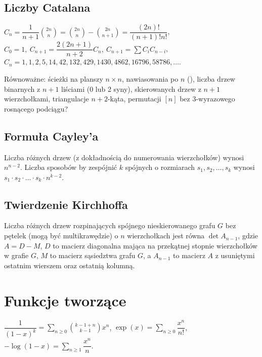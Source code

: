 	\subsection{Liczby Catalana}
		$ C_n=\dfrac{1}{n+1}\binom{2n}{n}= \binom{2n}{n}-\binom{2n}{n+1} = \dfrac{(2n)!}{(n+1)!n!} $,
		$ C_0=1,\ C_{n+1} = \dfrac{2(2n+1)}{n+2}C_n,\ C_{n+1}=\sum C_iC_{n-i} $,
		$C_n = 1, 1, 2, 5, 14, 42, 132, 429, 1430, 4862, 16796, 58786, \dots$.

		Równoważne:
			ścieżki na planszy $n\times n$,
			nawiasowania po $n$ (),
			liczba drzew binarnych z $n+1$ liściami (0 lub 2 syny),
			skierowanych drzew z $n+1$ wierzchołkami,
			triangulacje $n+2$-kąta,
			permutacji $[n]$ bez 3-wyrazowego rosnącego podciągu?

	\subsection{Formuła Cayley'a}
		Liczba różnych drzew (z dokładnością do numerowania wierzchołków) wynosi $n^{n-2}$.
		Liczba sposobów by zespójnić $k$ spójnych o rozmiarach $s_1, s_2, \dots, s_k$ wynosi $s_1 \cdot s_2 \cdot \dots \cdot s_k \cdot n^{k-2}$.

	\subsection{Twierdzenie Kirchhoffa}
		Liczba różnych drzew rozpinających spójnego nieskierowanego grafu $G$ bez pętelek (mogą być multikrawędzie) o $n$ wierzchołkach jest równa $\det A_{n-1}$, gdzie $A = D - M$, $D$ to macierz diagonalna mająca na przekątnej stopnie wierzchołków w grafie $G$, $M$ to macierz sąsiedztwa grafu $G$, a $A_{n-1}$ to macierz $A$ z usuniętymi ostatnim wierszem oraz ostatnią kolumną.

\section{Funkcje tworzące}
		$ \dfrac{1}{\left(1-x\right)^k} = \sum_{n\geq 0} \binom{k - 1 + n}{k - 1} x ^ n $,
		$ \exp(x) = \sum_{n\geq 0} \dfrac{x^n}{n!} $,
		$ -\log(1 - x) = \sum_{n\geq 1} \dfrac{x^n}{n} $.

